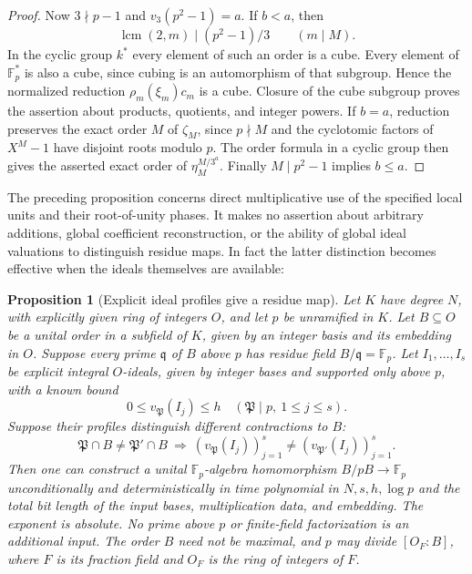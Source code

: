 \documentclass[11pt]{article}
\newcommand{\F}{\mathbb F}
\newtheorem{proposition}[theorem]{Proposition}
\theoremstyle{definition}
\theoremstyle{remark}
\begin{document}
\begin{proof}
Now $3\nmid p-1$ and $v_3(p^2-1)=a$.  If $b<a$, then
\[
 \operatorname{lcm}(2,m)\mid (p^2-1)/3
       \qquad(m\mid M).
\]
In the cyclic group $k^*$ every element of such an order is a
cube.  Every element of $\F_p^*$ is also a cube, since cubing
is an automorphism of that subgroup.  Hence the normalized
reduction $\rho_m(\xi_m)c_m$ is a cube.  Closure of the cube
subgroup proves the assertion about products, quotients, and
integer powers.  If $b=a$, reduction preserves the exact order $M$ of $\zeta_M$,
since $p\nmid M$ and the cyclotomic factors of $X^M-1$ have
disjoint roots modulo $p$. The order formula in a cyclic group
then gives the asserted exact order of $\eta_M^{M/3^a}$.
Finally $M\mid p^2-1$ implies $b\le a$.
\end{proof}

The preceding proposition concerns direct multiplicative use of
the specified local units and their root-of-unity phases.  It makes
no assertion about arbitrary additions, global coefficient
reconstruction, or the ability of global ideal valuations to
distinguish residue maps.  In fact the latter distinction becomes
effective when the ideals themselves are available:

\begin{proposition}[Explicit ideal profiles give a residue map]
\label{prop:ideal-profile-residue}
Let $K$ have degree $N$, with explicitly given ring of integers
$O$, and let $p$ be unramified in $K$.  Let $B\subseteq O$ be
a unital order in a subfield of $K$, given by an integer basis
and its embedding in $O$.  Suppose every prime $\mathfrak q$
of $B$ above $p$ has residue field $B/\mathfrak q=\F_p$.
Let $I_1,\ldots,I_s$ be explicit integral $O$-ideals, given by
integer bases and supported only above $p$, with a known bound
\[
 0\le v_{\mathfrak P}(I_j)\le h
       \quad(\mathfrak P\mid p,\ 1\le j\le s).
\]
Suppose their profiles distinguish different contractions to $B$:
\[
 \mathfrak P\cap B\ne\mathfrak P'\cap B
 \ \Longrightarrow\
 (v_{\mathfrak P}(I_j))_{j=1}^s
       \ne(v_{\mathfrak P'}(I_j))_{j=1}^s.
\]
Then one can construct a unital $\F_p$-algebra homomorphism
$B/pB\longrightarrow\F_p$ unconditionally and deterministically
in time polynomial in $N,s,h,\log p$ and the total bit length
of the input bases, multiplication data, and embedding.  The
exponent is absolute.  No prime above $p$ or finite-field
factorization is an additional input.  The order $B$ need not be
maximal, and $p$ may divide $[O_F:B]$, where $F$ is its fraction
field and $O_F$ is the ring of integers of $F$.
\end{proposition}
\end{document}

